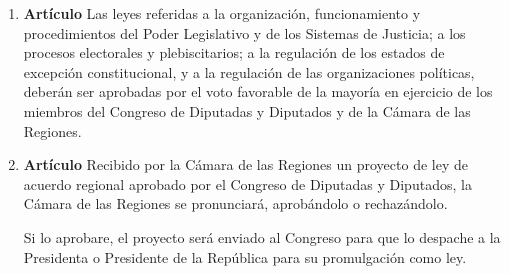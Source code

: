 \documentclass[11pt, a4paper]{article}
\begin{document}
\begin{enumerate}
\item \textbf{Artículo} \newline
Las leyes referidas a la organización, funcionamiento y procedimientos del Poder Legislativo y de los Sistemas de Justicia; a los procesos electorales y plebiscitarios; a la regulación de los estados de excepción constitucional, y a la regulación de las organizaciones políticas, deberán ser aprobadas por el voto favorable de la mayoría en ejercicio de los miembros del Congreso de Diputadas y Diputados y de la Cámara de las Regiones. 


\item \textbf{Artículo} \newline
Recibido por la Cámara de las Regiones un proyecto de ley de acuerdo regional aprobado por el Congreso de Diputadas y Diputados, la Cámara de las Regiones se pronunciará, aprobándolo o rechazándolo. 

Si lo aprobare, el proyecto será enviado al Congreso para que lo despache a la Presidenta o Presidente de la República para su promulgación como ley. 


\end{enumerate}
\end{document}
